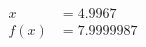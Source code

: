 \documentclass[preview]{standalone}
\begin{document}
\begin{align*}
x &= 4.9967\\f(x) &= 7.9999987
\end{align*}
\end{document}
